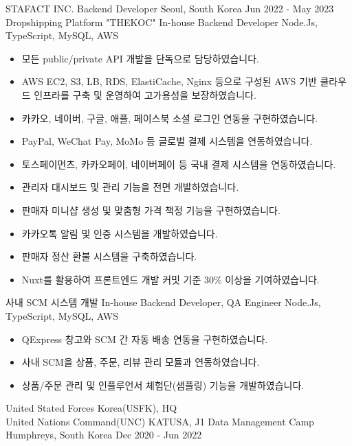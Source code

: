 \documentclass[10pt, a4paper]{cvhari}
\begin{document}
\smallskip
\divider
\smallskip

    \company
        {STAFACT INC.}
        {Backend Developer}
        {Seoul, South Korea}
        {Jun 2022 - May 2023}
        \project
        {Dropshipping Platform "THEKOC"}
        {In-house}
        {Backend Developer}
        {Node.Js, TypeScript, MySQL, AWS}
        
        \begin{itemize}
            \item 모든 public/private API 개발을 단독으로 담당하였습니다.
            \item AWS EC2, S3, LB, RDS, ElastiCache, Nginx 등으로 구성된 AWS 기반 클라우드 인프라를 구축 및 운영하여 고가용성을 보장하였습니다.
            \item 카카오, 네이버, 구글, 애플, 페이스북 소셜 로그인 연동을 구현하였습니다.
            \item PayPal, WeChat Pay, MoMo 등 글로벌 결제 시스템을 연동하였습니다.
            \item 토스페이먼츠, 카카오페이, 네이버페이 등 국내 결제 시스템을 연동하였습니다.
            \item 관리자 대시보드 및 관리 기능을 전면 개발하였습니다.
            \item 판매자 미니샵 생성 및 맞춤형 가격 책정 기능을 구현하였습니다.
            \item 카카오톡 알림 및 인증 시스템을 개발하였습니다.
            \item 판매자 정산 환불 시스템을 구축하였습니다.
            \item Nuxt를 활용하여 프론트엔드 개발 커밋 기준 30\% 이상을 기여하였습니다.
        \end{itemize}

        \project
        {사내 SCM 시스템 개발}
        {In-house}
        {Backend Developer, QA Engineer}
        {Node.Js, TypeScript, MySQL, AWS}

        \begin{itemize}
            \item QExpress 창고와 SCM 간 자동 배송 연동을 구현하였습니다.
            \item 사내 SCM을 상품, 주문, 리뷰 관리 모듈과 연동하였습니다.
            \item 상품/주문 관리 및 인플루언서 체험단(샘플링) 기능을 개발하였습니다.
        \end{itemize}

\smallskip
\divider
\smallskip

    \company
        {United Stated Forces Korea(USFK), HQ\\ United Nations Command(UNC)}
        {KATUSA, J1 Data Management}
        {Camp Humphreys, South Korea}
        {Dec 2020 - Jun 2022}
        
\end{document}
